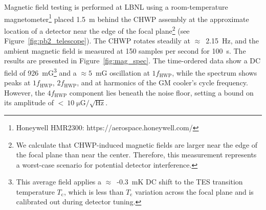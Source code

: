 Magnetic field testing is performed at LBNL using a room-temperature magnetometer\footnote{Honeywell HMR2300: https://aerospace.honeywell.com/} placed 1.5~m behind the CHWP assembly at the approximate location of a detector near the edge of the focal plane\footnote{We calculate that CHWP-induced magnetic fields are larger near the edge of the focal plane than near the center. Therefore, this measurement represents a worst-case scenario for potential detector interference.} (see Figure~\ref{fig:pb2_telescope}). The CHWP rotates steadily at $\approx$~2.15~Hz, and the ambient magnetic field is measured at 150 samples per second for 100~s. The results are presented in Figure~\ref{fig:mag_spec}. The time-ordered data show a DC field of 926~mG\footnote{This average field applies a $\approx$~-0.3~mK DC shift to the TES transition temperature $T_{\mathrm{c}}$, which is less than $T_{\mathrm{c}}$ variation across the focal plane \cite{westbrook_polarbear-2_2018} and is calibrated out during detector tuning.} and a $\approx 5$~mG oscillation at $1 f_{\mathrm{HWP}}$, while the spectrum shows peaks at $1 f_{\mathrm{HWP}}$, $2 f_{\mathrm{HWP}}$, and at harmonics of the GM cooler's cycle frequency. However, the $4 f_{\mathrm{HWP}}$ component lies beneath the noise floor, setting a bound on its amplitude of $< \: 10 \; \mathrm{\mu G / \sqrt{Hz}}$.

